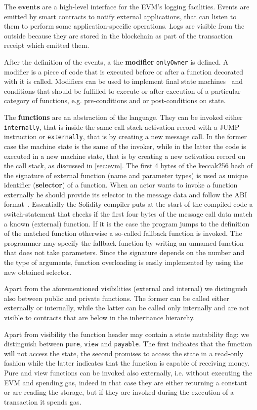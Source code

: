 The \textbf{events} are a high-level interface for the EVM's logging 
facilities. Events are emitted by smart contracts to notify external 
applications, that can listen to them to perform some application-specific
operations. Logs are visible from the outside because they are stored
in the blockchain as part of the transaction receipt which emitted them.

After the definition of the events, a the \textbf{modifier} \verb|onlyOwner| is
defined. A modifier is a piece of code that is executed before or after a 
function decorated with it is called. Modifiers can be used to implement final
state machines~\cite{bib:solidity-docs} and conditions that should be fulfilled 
to execute or after execution of a particular category of functions, e.g. 
pre-conditions and or post-conditions on state.

The \textbf{functions} are an abstraction of the language. They can be invoked 
either  \texttt{internally}, that is inside the same call stack activation 
record with a JUMP instruction or \texttt{externally}, that is by creating a
new message  call. In the former case the machine state is the same of the
invoker, while in the latter the code is executed in a new machine state, that is by creating a new activation record on the call stack, as discussed in
\autoref{sec:evm}.
The first 4 bytes of the keccak256 hash of the signature of external function
(name and parameter types) is used as unique identifier (\textbf{selector}) of
a function. When an actor wants to invoke a function externally he should 
provide its selector in the message data and follow the ABI
format~\cite{bib:solidity-docs}.
Essentially the Solidity compiler puts at the start of the compiled code a
switch-statement that checks if the first four bytes of the message call data
match a known (external) function. If it is the case the program jumps to the
definition of the matched function otherwise a so-called fallback function is 
invoked.
The programmer may specify the fallback function by writing an unnamed function
that does not take parameters. Since the signature depends on the number and
the type of arguments, function overloading is easily implemented by using
the new obtained selector.

Apart from the aforementioned visibilities (external and internal)
we distinguish also between public and private functions. The former can be
called either externally or internally, while the latter can be called only 
internally and are not visible to contracts that are below in the inheritance
hierarchy.

Apart from visibility the function header may contain a state mutability flag:
we distinguish between \texttt{pure}, \texttt{view} and \texttt{payable}. 
The first indicates that the function will not access the state, the second
promises to access the state in a read-only fashion while the latter indicates 
that the function is capable of receiving money.
Pure and view functions can be invoked also externally, i.e. without executing
the EVM and spending gas, indeed in that case they are either returning a
constant or are reading the storage, but if they are invoked during the
execution of a transaction it spends gas.




